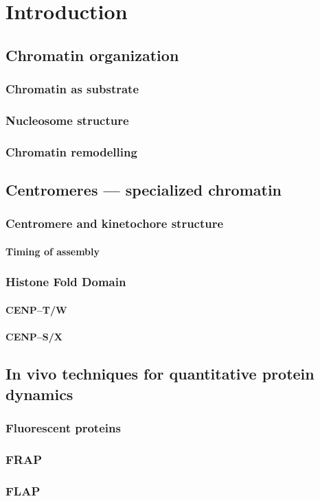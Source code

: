 \chapter{Introduction}
\label{ch:intro}

\section{Chromatin organization}
  \subsection{Chromatin as substrate}
  \subsection{Nucleosome structure}
  \subsection{Chromatin remodelling}

\section{Centromeres --- specialized chromatin}
  \subsection{Centromere and kinetochore structure}
    \subsubsection{Timing of assembly}
  \subsection{Histone Fold Domain}
    \subsubsection{CENP--T/W}
    \subsubsection{CENP--S/X}

\section{In vivo techniques for quantitative protein dynamics}
  \subsection{Fluorescent proteins}
  \subsection{FRAP}
  \subsection{FLAP}

